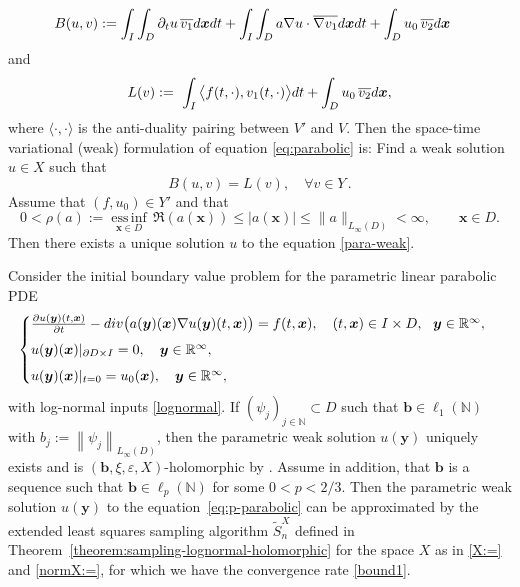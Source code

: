\documentclass[11pt]{article}
\numberwithin{equation}{section}
\theoremstyle{definition}
\theoremstyle{remark}
\newcommand{\norm}[2]{\left\|{#1}\right\|_{#2}}
\newcommand{\bb}{{\boldsymbol{b}}}
\newcommand{\bx}{{\boldsymbol{x}}}
\newcommand{\by}{{\boldsymbol{y}}}
\newcommand{\rd}{{\rm d}}
\def\NN{{\mathbb N}}
\def\NN{{\mathbb N}}
\def\RRi{{\mathbb R}^\infty}
\def\NN{{\mathbb N}}
\begin{document}
{\begin{equation*}
 	\begin{split}
 		B(u,v)& := \int_I \int_D \partial_t u\,\overline{v_1}\rd \bx
 		\rd t + \int_I\int_D a\nabla u \cdot \overline{\nabla v_1} \rd
 		\bx \rd t + \int_D u_0\,\overline{v_2 } \rd \bx
 	\end{split}
 \end{equation*}
 and
 \begin{equation*}
 	\begin{split}
 		L(v) := \ \int_I \big\langle f(t,\cdot),v_1(t,\cdot) \big\rangle
 		\rd t + \int_D u_0 \,\overline{v_2 } \rd \bx,
 	\end{split}
 \end{equation*}
where $\langle \cdot,\cdot \rangle$ is the anti-duality pairing
 between $V'$ and $V$. Then the space-time variational (weak) formulation of
 equation \eqref{eq:parabolic} is: Find a weak solution $u \in X$ such that
\begin{equation}\label{para-weak}
 	B(u,v)=L(v),\quad \forall v\in Y\,.
 \end{equation}
 	Assume that $(f,u_0)\in Y'$ and that
 \begin{equation}\label{eq:para-uni}
 	0 < \rho(a) := \underset{\bx\in D}{\operatorname{ess \, inf}}\,\Re(a(\bx))
 	\leq |a(\bx)|
 	\leq \|a\|_{L_\infty(D)}
     <\infty,\qquad \bx\in D {.}
 \end{equation}
 Then there exists a unique solution $u$ to the equation
 \eqref{para-weak}.
 
 Consider the initial boundary value problem for the parametric linear parabolic PDE 
\begin{equation}\label{eq:p-parabolic}
	\begin{cases}
		\frac{\partial u(\by)(t,\bx)}{\partial t} 
		- {\rm div}\big(a(\by)(\bx)\nabla u(\by)(t,\bx)\big)=f(t,\bx), \quad (t,\bx)\in I\times D, \ \ \by \in \RRi,
		\\[1ex]
		u(\by)(\bx)|_{\partial D\times I}=0, \quad \by \in \RRi,
		\\[1ex]
		u(\by)(\bx)|_{t=0}=u_0(\bx), \quad \by \in \RRi,
	\end{cases}
\end{equation}
with log-normal inputs \eqref{lognormal}. 
If
$(\psi_j)_{j\in\NN}\subset D$ such that $\bb\in\ell_1(\NN)$ with
$b_j:=\norm{\psi_j}{L_\infty(D)}$, 
then the parametric weak solution $u(\by)$ uniquely exists and is {$(\bb,\xi,\varepsilon,X)$}-holomorphic by \cite[Theorem 4.11]{DNSZ2023}. 	
Assume in addition, that $\bb$ is a  sequence such that $\bb\in\ell_p(\NN)$
for some $0 < p <2/3$. Then the parametric weak solution $u(\by)$ to the equation~\eqref{eq:p-parabolic} can be approximated by the extended least squares sampling algorithm $\tilde{S}_{n}^X$ defined in Theorem~\ref{theorem:sampling-lognormal-holomorphic} for  the space $X$ as in \eqref{X:=} and \eqref{normX:=}, for which we have the convergence rate \eqref{bound1}.

}
\end{document}
